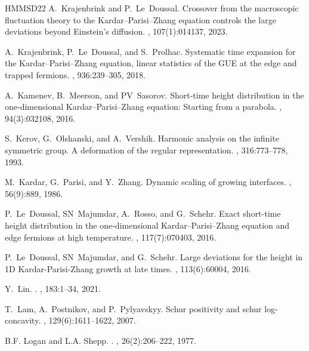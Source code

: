 \documentclass[reqno,11pt]{amsart}
\numberwithin{equation}{section}
\theoremstyle{definition}
\begin{document}
\begin{thebibliography}{HMMSD22}
A.~Krajenbrink and P.~Le~Doussal.
\newblock Crossover from the macroscopic fluctuation theory to the {K}ardar{--P}arisi{--Z}hang equation controls the large deviations beyond {E}instein's diffusion.
, 107(1):014137, 2023.

A.~Krajenbrink, P.~Le~Doussal, and S.~Prolhac.
\newblock Systematic time expansion for the {Kardar--Parisi--Zhang equation}, linear statistics of the {GUE} at the edge and trapped fermions.
, 936:239--305, 2018.

A.~Kamenev, B.~Meerson, and PV~Sasorov.
\newblock Short-time height distribution in the one-dimensional {K}ardar{--P}arisi{--Z}hang equation: Starting from a parabola.
, 94(3):032108, 2016.

S.~Kerov, G.~Olshanski, and A.~Vershik.
\newblock Harmonic analysis on the infinite symmetric group. {A} deformation of the regular representation.
, 316:773--778, 1993.

M.~Kardar, G.~Parisi, and Y.~Zhang.
\newblock Dynamic scaling of growing interfaces.
, 56(9):889, 1986.

P.~Le~Doussal, SN~Majumdar, A.~Rosso, and G.~Schehr.
\newblock Exact short-time height distribution in the one-dimensional {K}ardar{--P}arisi{--Z}hang equation and edge fermions at high temperature.
, 117(7):070403, 2016.

P.~Le~Doussal, SN~Majumdar, and G.~Schehr.
\newblock Large deviations for the height in 1{D} {K}ardar-{P}arisi-{Z}hang growth at late times.
, 113(6):60004, 2016.

Y.~Lin.
.
, 183:1--34, 2021.

T.~Lam, A.~Postnikov, and P.~Pylyavskyy.
\newblock Schur positivity and schur log-concavity.
, 129(6):1611--1622, 2007.

B.F. Logan and L.A. Shepp.
.
, 26(2):206--222, 1977.


\end{thebibliography}
\end{document}
